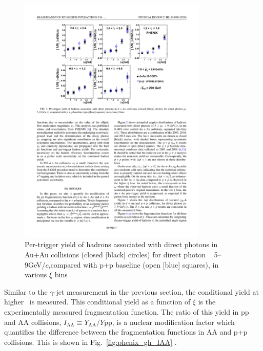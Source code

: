 \begin{figure}[htpb]
  \centering
  \includegraphics[width=0.8\textwidth]{Introduction/phenix_gh_corr.pdf}
  \caption{Per-trigger yield of hadrons associated with direct photons in Au+Au collisions (closed [black] circles) for direct photon \pT~ 5–9GeV/$c$,compared with p+p baseline (open [blue] squares), in various $\xi$ bins \cite{PHENIXCollaboration2020}.}
  \label{fig:phenix_gh_corr}
\end{figure}

Similar to the $\gamma$-jet measurement in the previous section, the conditional yield at higher \deltaphi~is measured. This conditional yield as a function of $\xi$ is the experimentally measured fragmentation function. The ratio of this yield in pp and AA collisions, $I_\mathrm{AA} \equiv Y_\mathrm{AA}/Y\mathrm{pp}$, is a nuclear modification factor which quantifies the difference between the fragmentation functions in AA and p+p collisions. This is shown in Fig.~\ref{fig:phenix_gh_IAA} \cite{PHENIXCollaboration2020}. 

